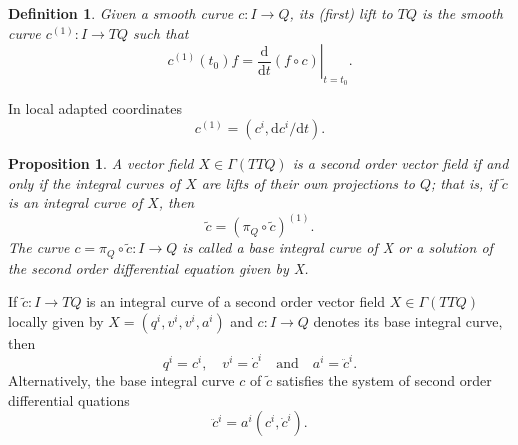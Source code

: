 \documentclass[11pt]{article}
\theoremstyle{plain}%
\newtheorem{pro}{Proposition}[section]%
\newtheorem{defi}{Definition}[section]%
\newcommand{\dd}{{\mathrm{d}}}  %
\begin{document}
\begin{defi}
	Given a smooth curve $c:I\to Q$, its (first) lift to $TQ$ is the smooth curve $c^{(1)}:I\to TQ$ such that
	\[
		c^{(1)} (t_0)f=\left.\frac{\dd}{\dd t}(f\circ c)\right|_{t=t_0}.
	\]
\end{defi}
In local adapted coordinates
\[
	c^{(1)}=(c^i,\dd c^i/\dd t).
\]
\begin{pro}
	A vector field $X \in \Gamma(TTQ)$ is a second order vector field if and only if the integral curves of $X$ are lifts of their own projections to $Q$; that is, if $\widetilde{c}$ is an integral curve of $X$, then
	\[
		\widetilde{c}=(\pi_Q\circ \widetilde{c})^{(1)}.
	\]
	The curve $c=\pi_Q\circ \widetilde{c}:I\to Q$ is called a base integral curve of X or a solution of the second order differential equation given by X.
\end{pro}
If $\widetilde{c}:I \to TQ$ is an integral curve of a second order vector field $X \in \Gamma(TTQ)$ locally given by $X=(q^i,v^i,v^i,a^i)$ and $c:I \to Q$ denotes its base integral curve, then
\[
	q^i=c^i,\quad v^i=\dot{c}^i\quad\text{and}\quad a^i=\ddot{c}^i.
\]
Alternatively, the base integral curve $c$ of $\widetilde{c}$ satisfies the system of second order differential quations
\[
	\ddot{c}^i = a^i (c^i , \dot{c}^i).
\]
\end{document}
